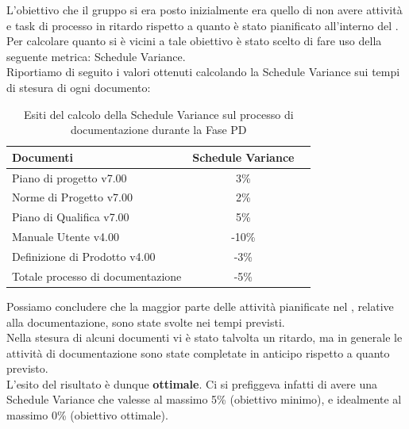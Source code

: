 				L'obiettivo che il gruppo si era posto inizialmente era quello di non avere attività e task di processo in ritardo rispetto a quanto è stato pianificato all'interno del . Per calcolare quanto si è vicini a tale obiettivo è stato scelto di fare uso della seguente metrica: Schedule Variance.\\
				Riportiamo di seguito i valori ottenuti calcolando la Schedule Variance sui tempi di stesura di ogni documento:			
				\begin{table}[H]
					\centering
					\begin{tabu}{| l | c | c |}
						\hline
						Documenti 							& Schedule Variance   \\ \hline \hline
						Piano di progetto v7.00				& 3\%                 \\ \hline
						Norme di Progetto v7.00 			& 2\%                 \\ \hline
						Piano di Qualifica v7.00 			& 5\%                 \\ \hline
						Manuale Utente v4.00 				& -10\%               \\ \hline
						Definizione di Prodotto v4.00 		& -3\%                \\ \hline
						Totale processo di documentazione 	& -5\%                \\ \hline
					\end{tabu}
					\caption{Esiti del calcolo della Schedule Variance sul processo di documentazione durante la Fase PD}
				\end{table}
				Possiamo concludere che la maggior parte delle attività pianificate nel , relative alla documentazione, sono state svolte nei tempi previsti.\\ Nella stesura di alcuni documenti vi è stato talvolta un ritardo, ma in generale le attività di documentazione sono state completate in anticipo rispetto a quanto previsto.\\
				L'esito del risultato è dunque \textbf{ottimale}. Ci si prefiggeva infatti di avere una Schedule Variance che valesse al massimo 5\% (obiettivo minimo), e idealmente al massimo 0\% (obiettivo ottimale).

